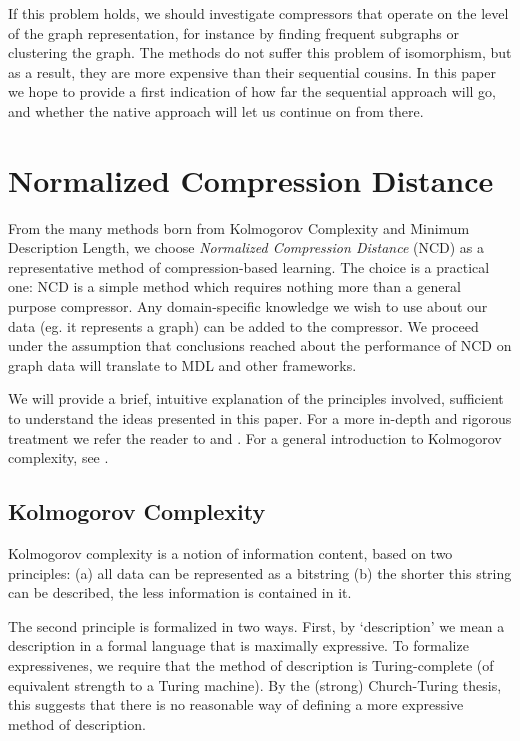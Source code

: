 \documentclass{article}
\begin{document}
If this problem holds, we should investigate compressors that operate on the level of the graph representation, for instance by finding frequent subgraphs or clustering the graph. The methods do not suffer this problem of isomorphism, but as a result, they are more expensive than their sequential cousins. In this paper we hope to provide a first indication of how far the sequential approach will go, and whether the native approach will let us continue on from there.

\section*{Normalized Compression Distance}

From the many methods born from Kolmogorov Complexity and Minimum Description Length, we choose \emph{Normalized Compression Distance} (NCD) as a representative method of compression-based learning. The choice is a practical one: NCD is a simple method which requires nothing more than a general purpose compressor. Any domain-specific knowledge we wish to use about our data (eg. it represents a graph) can be added to the compressor. We proceed under the assumption that conclusions reached about the performance of NCD on graph data will translate to MDL and other frameworks.

We will provide a brief, intuitive explanation of the principles involved, sufficient to understand the ideas presented in this paper. For a more in-depth and rigorous treatment we refer the reader to \cite{li2004similarity} and \cite{cilibrasi2005clustering}. For a general introduction to Kolmogorov complexity, see \cite{li1997introduction}.

\subsection*{Kolmogorov Complexity}

Kolmogorov complexity is a notion of information content, based on two principles: (a) all data can be represented as a bitstring (b) the shorter this string can be described, the less information is contained in it.

The second principle is formalized in two ways. First, by `description' we mean a description in a formal language that is maximally expressive. To formalize expressivenes, we require that the method of description is Turing-complete (of equivalent strength to a Turing machine). By the (strong) Church-Turing thesis, this suggests that there is no reasonable way of defining a more expressive method of description.
\end{document}
